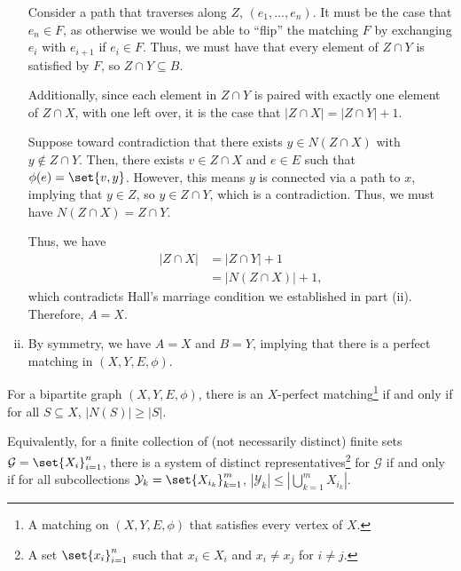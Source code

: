 \documentclass[10pt]{mypackage}
\begin{document}
\begin{solution}
\begin{enumerate}[(i)]
        Consider a path that traverses along $Z$, $\left(e_1,\dots,e_n\right)$. It must be the case that $e_n\in F$, as otherwise we would be able to ``flip'' the matching $F$ by exchanging $e_i$ with $e_{i+1}$ if $e_i\in F$. Thus, we must have that every element of $Z\cap Y$ is satisfied by $F$, so $Z\cap Y\subseteq B$.\newline

        Additionally, since each element in $Z\cap Y$ is paired with exactly one element of $Z\cap X$, with one left over, it is the case that $\left\vert Z\cap X \right\vert = \left\vert Z\cap Y \right\vert + 1$.\newline

        Suppose toward contradiction that there exists $y\in N\left(Z\cap X\right)$ with $y\notin Z\cap Y$. Then, there exists $v\in Z\cap X$ and $e\in E$ such that $\phi(e) = \set{v,y}$. However, this means $y$ is connected via a path to $x$, implying that $y\in Z$, so $y\in Z\cap Y$, which is a contradiction. Thus, we must have $N\left(Z\cap X\right) = Z\cap Y$.\newline

        Thus, we have
        \begin{align*}
          \left\vert Z\cap X \right\vert &= \left\vert Z\cap Y \right\vert + 1\\
                                         &= \left\vert N\left(Z\cap X\right)  \right\vert + 1,
        \end{align*}
        which contradicts Hall's marriage condition we established in part (ii). Therefore, $A = X$.
      \item By symmetry, we have $A = X$ and $B = Y$, implying that there is a perfect matching in $\left(X,Y,E,\phi\right)$.
    \end{enumerate}
  \end{solution}
  \begin{definition}
    For a bipartite graph $\left(X,Y,E,\phi\right)$, there is an $X$-perfect matching\footnote{A matching on $\left(X,Y,E,\phi\right)$ that satisfies every vertex of $X$.} if and only if for all $S\subseteq X$, $\left\vert N(S) \right\vert \geq \left\vert S \right\vert$.\newline

    Equivalently, for a finite collection of (not necessarily distinct) finite sets $\mathcal{G} = \set{X_i}_{i=1}^{n}$, there is a system of distinct representatives\footnote{A set $\set{x_i}_{i=1}^{n}$ such that $x_i\in X_i$ and $x_{i}\neq x_j$ for $i\neq j$.} for $\mathcal{G}$ if and only if for all subcollections $\mathcal{Y}_k = \set{X_{i_k}}_{k=1}^{m}$, $\left\vert \mathcal{Y}_k \right\vert\leq \left\vert \bigcup_{k=1}^{m}X_{i_k} \right\vert$.
  \end{definition}
\end{document}
